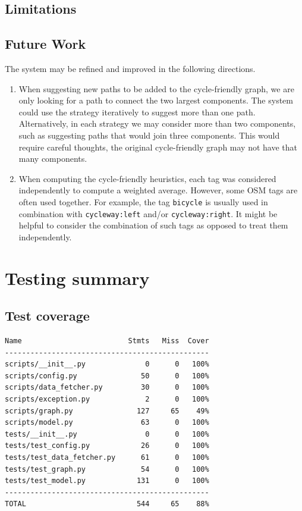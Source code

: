 \documentclass[12pt,a4paper]{report}
\begin{document}
\section{Limitations}

\section{Future Work}
The system may be refined and improved in the following directions.
\begin{enumerate}
    \item When suggesting new paths to be added to the cycle-friendly graph, we are only looking for a path to connect the two largest components. The system could use the strategy iteratively to suggest more than one path. Alternatively, in each strategy we may consider more than two components, such as suggesting paths that would join three components. This would require careful thoughts, the original cycle-friendly graph may not have that many components.
    \item When computing the cycle-friendly heuristics, each tag was considered independently to compute a weighted average. However, some OSM tags are often used together. For example, the tag \texttt{bicycle} is usually used in combination with \texttt{cycleway:left} and/or \texttt{cycleway:right}. It might be helpful to consider the combination of such tags as opposed to treat them independently.
\end{enumerate}




\appendix
\chapter{Testing summary}\label{app:test}
\section*{Test coverage}
\begin{lstlisting}
Name                         Stmts   Miss  Cover
------------------------------------------------
scripts/__init__.py              0      0   100%
scripts/config.py               50      0   100%
scripts/data_fetcher.py         30      0   100%
scripts/exception.py             2      0   100%
scripts/graph.py               127     65    49%
scripts/model.py                63      0   100%
tests/__init__.py                0      0   100%
tests/test_config.py            26      0   100%
tests/test_data_fetcher.py      61      0   100%
tests/test_graph.py             54      0   100%
tests/test_model.py            131      0   100%
------------------------------------------------
TOTAL                          544     65    88%
\end{lstlisting}
\end{document}
